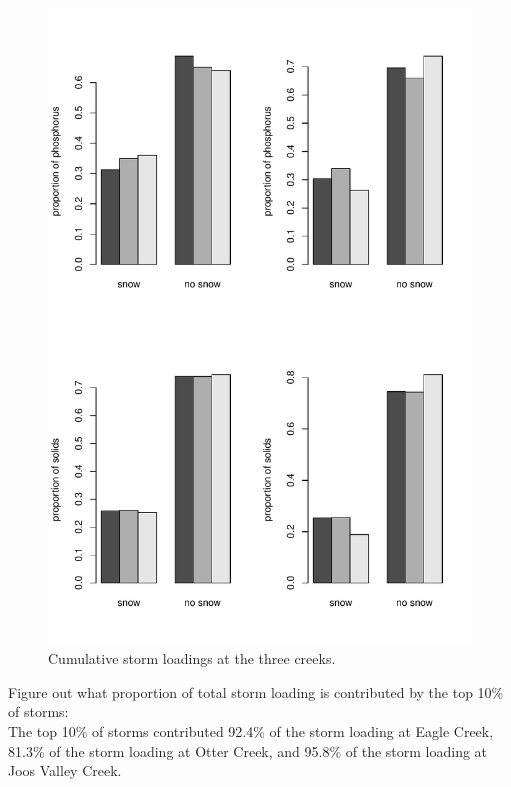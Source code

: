 \documentclass[12pt]{article}
\begin{document}
\begin{figure}
    \begin{center}
\includegraphics{loadings-fig3}
    \end{center}
    \caption{Cumulative storm loadings at the three creeks.\label{bars2}}
\end{figure}



Figure out what proportion of total storm loading is contributed by the top 10\% of storms:\\


The top 10\% of storms contributed 92.4\% of the storm loading at Eagle Creek, 81.3\% of the storm loading at Otter Creek, and 95.8\% of the storm loading at Joos Valley Creek.\\
\end{document}
